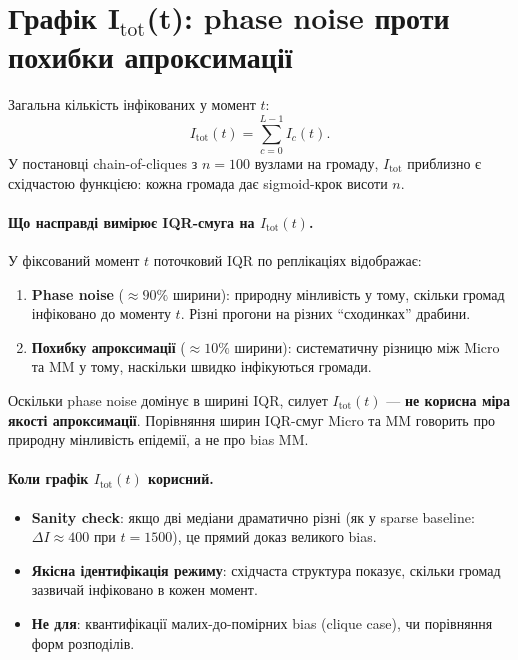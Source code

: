 \documentclass[11pt,a4paper]{article}
\begin{document}
\section{Графік I\texorpdfstring{$_{\mathrm{tot}}$}{tot}(t): phase noise проти похибки апроксимації}
\label{sec:itot}

Загальна кількість інфікованих у момент $t$:
\[
  I_{\mathrm{tot}}(t) = \sum_{c=0}^{L-1} I_c(t).
\]
У постановці chain-of-cliques з $n=100$ вузлами на громаду, $I_{\mathrm{tot}}$
приблизно є східчастою функцією: кожна громада дає sigmoid-крок
висоти $n$.

\paragraph{Що насправді вимірює IQR-смуга на $I_{\mathrm{tot}}(t)$.}
У фіксований момент $t$ поточковий IQR по реплікаціях відображає:
\begin{enumerate}
  \item \textbf{Phase noise} ($\approx 90\%$ ширини): природну мінливість
        у тому, скільки громад інфіковано до моменту $t$.
        Різні прогони на різних ``сходинках'' драбини.
  \item \textbf{Похибку апроксимації} ($\approx 10\%$ ширини): систематичну
        різницю між Micro та MM у тому, наскільки швидко інфікуються громади.
\end{enumerate}

Оскільки phase noise домінує в ширині IQR, силует $I_{\mathrm{tot}}(t)$ ---
\textbf{не корисна міра якості апроксимації}.  Порівняння ширин
IQR-смуг Micro та MM говорить про природну мінливість епідемії, а не про
bias MM.

\paragraph{Коли графік $I_{\mathrm{tot}}(t)$ корисний.}
\begin{itemize}
  \item \textbf{Sanity check}: якщо дві медіани драматично різні
        (як у sparse baseline: $\Delta I \approx 400$ при $t=1500$),
        це прямий доказ великого bias.
  \item \textbf{Якісна ідентифікація режиму}: східчаста структура показує,
        скільки громад зазвичай інфіковано в кожен момент.
  \item \textbf{Не для}: квантифікації малих-до-помірних bias (clique case),
        чи порівняння форм розподілів.
\end{itemize}
\end{document}
